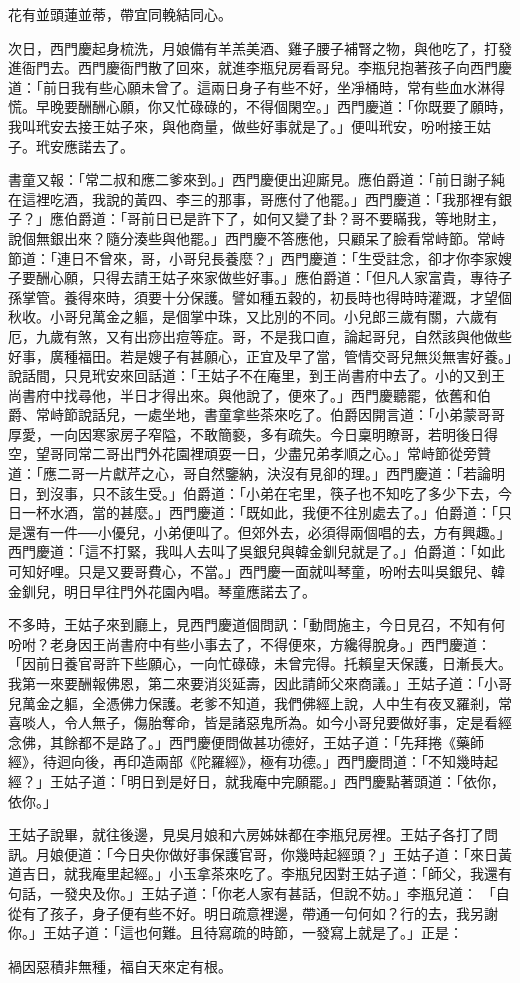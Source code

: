 花有並頭蓮並蒂，帶宜同輓結同心。

次日，西門慶起身梳洗，月娘備有羊羔美酒、雞子腰子補腎之物，與他吃了，打發進衙門去。西門慶衙門散了回來，就進李瓶兒房看哥兒。李瓶兒抱著孩子向西門慶道：「前日我有些心願未曾了。這兩日身子有些不好，坐凈桶時，常有些血水淋得慌。早晚要酬酬心願，你又忙碌碌的，不得個閑空。」西門慶道：「你既要了願時，我叫玳安去接王姑子來，與他商量，做些好事就是了。」便叫玳安，吩咐接王姑子。玳安應諾去了。

書童又報：「常二叔和應二爹來到。」西門慶便出迎廝見。應伯爵道：「前日謝子純在這裡吃酒，我說的黃四、李三的那事，哥應付了他罷。」西門慶道：「我那裡有銀子？」應伯爵道：「哥前日已是許下了，如何又變了卦？哥不要瞞我，等地財主，說個無銀出來？隨分湊些與他罷。」西門慶不答應他，只顧呆了臉看常峙節。常峙節道：「連日不曾來，哥，小哥兒長養麼？」西門慶道：「生受註念，卻才你李家嫂子要酬心願，只得去請王姑子來家做些好事。」應伯爵道：「但凡人家富貴，專待子孫掌管。養得來時，須要十分保護。譬如種五穀的，初長時也得時時灌溉，才望個秋收。小哥兒萬金之軀，是個掌中珠，又比別的不同。小兒郎三歲有關，六歲有厄，九歲有煞，又有出痧出痘等症。哥，不是我口直，論起哥兒，自然該與他做些好事，廣種福田。若是嫂子有甚願心，正宜及早了當，管情交哥兒無災無害好養。」說話間，只見玳安來回話道：「王姑子不在庵里，到王尚書府中去了。小的又到王尚書府中找尋他，半日才得出來。與他說了，便來了。」西門慶聽罷，依舊和伯爵、常峙節說話兒，一處坐地，書童拿些茶來吃了。伯爵因開言道：「小弟蒙哥哥厚愛，一向因寒家房子窄隘，不敢簡褻，多有疏失。今日稟明瞭哥，若明後日得空，望哥同常二哥出門外花園裡頑耍一日，少盡兄弟孝順之心。」常峙節從旁贊道：「應二哥一片獻芹之心，哥自然鑒納，決沒有見卻的理。」西門慶道：「若論明日，到沒事，只不該生受。」伯爵道：「小弟在宅里，筷子也不知吃了多少下去，今日一杯水酒，當的甚麼。」西門慶道：「既如此，我便不往別處去了。」伯爵道：「只是還有一件──小優兒，小弟便叫了。但郊外去，必須得兩個唱的去，方有興趣。」西門慶道：「這不打緊，我叫人去叫了吳銀兒與韓金釧兒就是了。」伯爵道：「如此可知好哩。只是又要哥費心，不當。」西門慶一面就叫琴童，吩咐去叫吳銀兒、韓金釧兒，明日早往門外花園內唱。琴童應諾去了。

不多時，王姑子來到廳上，見西門慶道個問訊：「動問施主，今日見召，不知有何吩咐？老身因王尚書府中有些小事去了，不得便來，方纔得脫身。」西門慶道： 「因前日養官哥許下些願心，一向忙碌碌，未曾完得。托賴皇天保護，日漸長大。我第一來要酬報佛恩，第二來要消災延壽，因此請師父來商議。」王姑子道：「小哥兒萬金之軀，全憑佛力保護。老爹不知道，我們佛經上說，人中生有夜叉羅剎，常喜啖人，令人無子，傷胎奪命，皆是諸惡鬼所為。如今小哥兒要做好事，定是看經念佛，其餘都不是路了。」西門慶便問做甚功德好，王姑子道：「先拜捲《藥師經》，待迴向後，再印造兩部《陀羅經》，極有功德。」西門慶問道：「不知幾時起經？」王姑子道：「明日到是好日，就我庵中完願罷。」西門慶點著頭道：「依你，依你。」

王姑子說畢，就往後邊，見吳月娘和六房姊妹都在李瓶兒房裡。王姑子各打了問訊。月娘便道：「今日央你做好事保護官哥，你幾時起經頭？」王姑子道：「來日黃道吉日，就我庵里起經。」小玉拿茶來吃了。李瓶兒因對王姑子道：「師父，我還有句話，一發央及你。」王姑子道：「你老人家有甚話，但說不妨。」李瓶兒道： 「自從有了孩子，身子便有些不好。明日疏意裡邊，帶通一句何如？行的去，我另謝你。」王姑子道：「這也何難。且待寫疏的時節，一發寫上就是了。」正是：

禍因惡積非無種，福自天來定有根。


